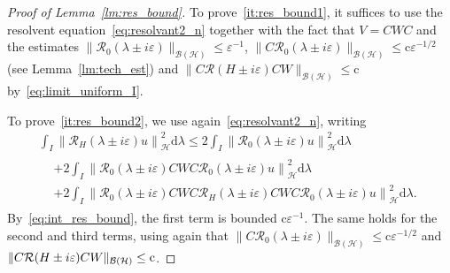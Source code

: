 \documentclass[10pt]{amsart}
\theoremstyle{definition}\newtheorem{defi}[theo]{Definition}\newtheorem{rema}[theo]{Remark}\newtheorem{exam}[theo]{Example}\newtheorem{exem}[theo]{Example}\newtheorem{nota}[theo]{Notation}
\newcommand{\Hi}{\mathcal{H}}
\newcommand{\rmc}{\mathrm{c}}
\newcommand{\rmd}{\mathrm{d}}
\newcommand{\Res}{\mathcal{R}}
\newcommand{\clB}{\mathcal{B}}
\begin{document}
\begin{proof}[Proof of Lemma~\ref{lm:res_bound}]
To prove~\eqref{it:res_bound1}, it suffices to use the resolvent equation~\eqref{eq:resolvant2_n} together with the fact that $V=CWC$ and the estimates $\|\Res_0(\lambda\pm i\varepsilon)\|_{\clB(\Hi)}\le\varepsilon^{-1}$, $\|C\Res_0(\lambda\pm i\varepsilon)\|_{\clB(\Hi)}\le\rmc \varepsilon^{-1/2}$ (see Lemma~\ref{lm:tech_est}) and $\|C\Res(H\pm i\varepsilon)CW\|_{\clB(\Hi)}\le\rmc$ by~\eqref{eq:limit_uniform_I}.

To prove~\eqref{it:res_bound2}, we use again~\eqref{eq:resolvant2_n}, writing
\begin{multline*}
\int_I \left\|\Res_H(\lambda\pm i\varepsilon) u\right\|_\Hi^2\rmd \lambda \le2 \int_I \left\|\Res_0(\lambda\pm i\varepsilon) u\right\|_\Hi^2\rmd \lambda \\
\begin{aligned}
&+2\int_I \left\|\Res_0(\lambda\pm i\varepsilon)CWC\Res_0(\lambda\pm i\varepsilon) u\right\|_\Hi^2\rmd \lambda \\
&+2\int_I \left\|\Res_0(\lambda\pm i\varepsilon)CWC\Res_H(\lambda\pm i\varepsilon)CWC\Res_0(\lambda\pm i\varepsilon) u\right\|_\Hi^2\rmd \lambda.
\end{aligned}
\end{multline*}
By~\eqref{eq:int_res_bound}, the first term is bounded $\rmc\varepsilon^{-1}$. The same holds for the second and third terms, using again that $\|C\Res_0(\lambda\pm i\varepsilon)\|_{\clB(\Hi)}\le\rmc \varepsilon^{-1/2}$ and $\|C\Res(H\pm i\varepsilon)CW\|_{\clB(\Hi)}\linebreak\le\rmc$.
\end{proof}
\end{document}
